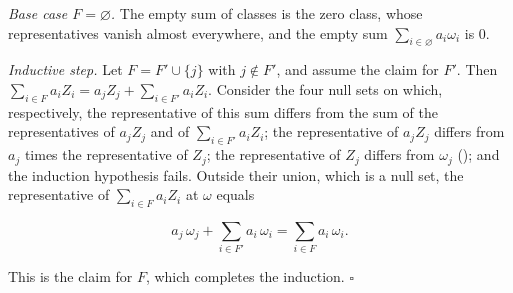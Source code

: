 \documentclass[11pt,a4paper]{article}
\begin{document}
\emph{Base case \(F=\varnothing\).} The empty sum of classes is the zero class, whose representatives vanish almost everywhere, and the empty sum \(\sum_{i\in\varnothing}a_i\omega_i\) is \(0\).




\emph{Inductive step.} Let \(F=F'\cup\{j\}\) with \(j\notin F'\), and assume the claim for \(F'\). Then \(\sum_{i\in F}a_iZ_i=a_jZ_j+\sum_{i\in F'}a_iZ_i\). Consider the four null sets on which, respectively, the representative of this sum differs from the sum of the representatives of \(a_jZ_j\) and of \(\sum_{i\in F'}a_iZ_i\); the representative of \(a_jZ_j\) differs from \(a_j\) times the representative of \(Z_j\); the representative of \(Z_j\) differs from \(\omega_j\) (\cite[Section~3.6.5]{LangevinLean2026ULASC}); and the induction hypothesis fails. Outside their union, which is a null set, the representative of \(\sum_{i\in F}a_iZ_i\) at \(\omega\) equals


\[a_j\,\omega_j+\sum_{i\in F'}a_i\,\omega_i=\sum_{i\in F}a_i\,\omega_i.\]


This is the claim for \(F\), which completes the induction. \(\square\)
\end{document}
